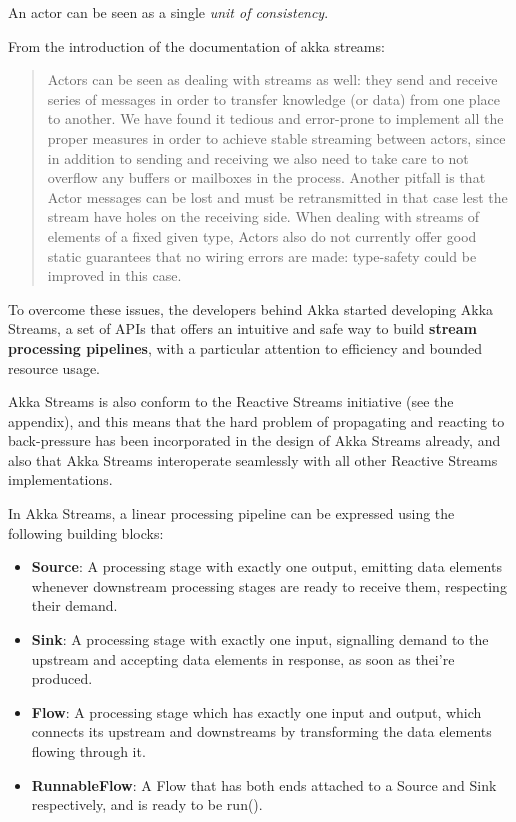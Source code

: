 An actor can be seen as a single \emph{unit of consistency}.

From the introduction of the documentation of akka streams:

\begin{quote}
Actors can be seen as dealing with streams as well: they send and
receive series of messages in order to transfer knowledge (or data) from
one place to another. We have found it tedious and error-prone to
implement all the proper measures in order to achieve stable streaming
between actors, since in addition to sending and receiving we also need
to take care to not overflow any buffers or mailboxes in the process.
Another pitfall is that Actor messages can be lost and must be
retransmitted in that case lest the stream have holes on the receiving
side. When dealing with streams of elements of a fixed given type,
Actors also do not currently offer good static guarantees that no wiring
errors are made: type-safety could be improved in this case.
\end{quote}

To overcome these issues, the developers behind Akka started developing
Akka Streams, a set of APIs that offers an intuitive and safe way to
build \textbf{stream processing pipelines}, with a particular attention
to efficiency and bounded resource usage.

Akka Streams is also conform to the Reactive Streams initiative (see the
appendix), and this means that the hard problem of propagating and
reacting to back-pressure has been incorporated in the design of Akka
Streams already, and also that Akka Streams interoperate seamlessly with
all other Reactive Streams implementations.

In Akka Streams, a linear processing pipeline can be expressed using the
following building blocks:

\begin{itemize}
\itemsep1pt\parskip0pt
\item
  \textbf{Source}: A processing stage with exactly one output, emitting
  data elements whenever downstream processing stages are ready to
  receive them, respecting their demand.
\item
  \textbf{Sink}: A processing stage with exactly one input, signalling
  demand to the upstream and accepting data elements in response, as
  soon as thei're produced.
\item
  \textbf{Flow}: A processing stage which has exactly one input and
  output, which connects its upstream and downstreams by transforming
  the data elements flowing through it.
\item
  \textbf{RunnableFlow}: A Flow that has both ends attached to a Source
  and Sink respectively, and is ready to be run().
\end{itemize}

